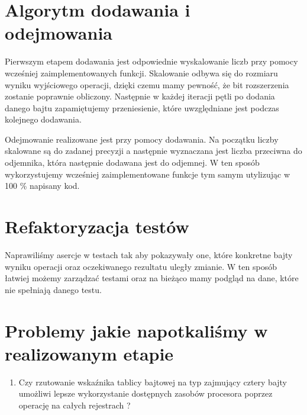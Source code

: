 \documentclass[a4paper]{article}
\begin{document}
\section{Algorytm dodawania i odejmowania}

Pierwszym etapem dodawania jest odpowiednie wyskalowanie liczb przy pomocy wcześniej zaimplementowanych funkcji. Skalowanie odbywa się do rozmiaru wyniku wyjściowego operacji, dzięki czemu mamy pewność, że bit rozszerzenia zostanie poprawnie obliczony. Następnie w każdej iteracji pętli po dodania danego bajtu zapamiętujemy przeniesienie, które uwzględniane jest podczas kolejnego dodawania.

Odejmowanie realizowane jest przy pomocy dodawania. Na początku liczby skalowane są do zadanej precyzji a następnie wyznaczana jest liczba przeciwna do odjemnika, która następnie dodawana jest do odjemnej. W ten sposób wykorzystujemy wcześniej zaimplementowane funkcje tym samym utylizując w 100 \% napisany kod.

\section{Refaktoryzacja testów}

Naprawiliśmy asercje w testach tak aby pokazywały one, które konkretne bajty wyniku operacji oraz oczekiwanego rezultatu uległy zmianie. W ten sposób łatwiej możemy zarządzać testami oraz na bieżąco mamy podgląd na dane, które nie spełniają danego testu.

\section{Problemy jakie napotkaliśmy w realizowanym etapie}
\begin{enumerate}
    \item Czy rzutowanie wskaźnika tablicy bajtowej na typ zajmujący cztery bajty umożliwi lepsze wykorzystanie dostępnych zasobów procesora poprzez operację na całych rejestrach ?
\end{enumerate}
\end{document}
